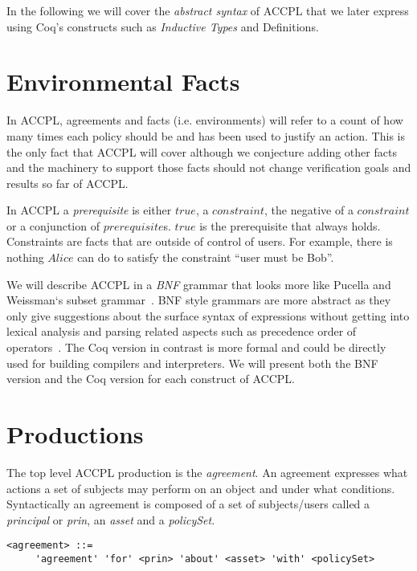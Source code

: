 In the following we will cover the \emph{abstract syntax} of \ac{ACCPL} that we later express using Coq's constructs such as \emph{Inductive Types} and Definitions. 

\section{Environmental Facts}\label{sec:odrl0}
In \ac{ACCPL}, agreements and facts (i.e. environments) will refer to a count of how many times each policy should be and has been used to justify an action. This is the only fact that \ac{ACCPL} will cover although we conjecture adding other facts and the machinery to support those facts should not change verification goals and results so far of \ac{ACCPL}.

In \ac{ACCPL} a \emph{prerequisite} is either $true$, a $constraint$, the negative of a $constraint$ or a conjunction of $prerequisite$s. $true$ is the prerequisite that always holds. Constraints are facts that are outside of control of users. For example, there is nothing $Alice$ can do to satisfy the constraint ``user must be Bob''. 

We will describe \ac{ACCPL} in a \emph{BNF} grammar that looks more like Pucella and Weissman`s subset grammar~\cite{pucella2006}. BNF style grammars are more abstract as they only give suggestions about the surface syntax of expressions without getting into lexical analysis and parsing related aspects such as precedence order of operators~\cite{piercesf2011}. The Coq version in contrast is more formal and could be directly used for building compilers and interpreters. We will present both the BNF version and the Coq version for each construct of \ac{ACCPL}. 


\section{Productions} \label{sec:productionast}

The top level \ac{ACCPL} production is the \emph{agreement}. An agreement expresses what actions a set of subjects may perform on an object and under what conditions. Syntactically an agreement is composed of a set of subjects/users called a \emph{principal} or \emph{prin}, an \emph{asset} and a \emph{policySet}.

\lstset{language=AST}
\begin{lstlisting}[frame=single, caption={agreement},label={lst:agreementast}]
<agreement> ::= 
     'agreement' 'for' <prin> 'about' <asset> 'with' <policySet> 
\end{lstlisting}


